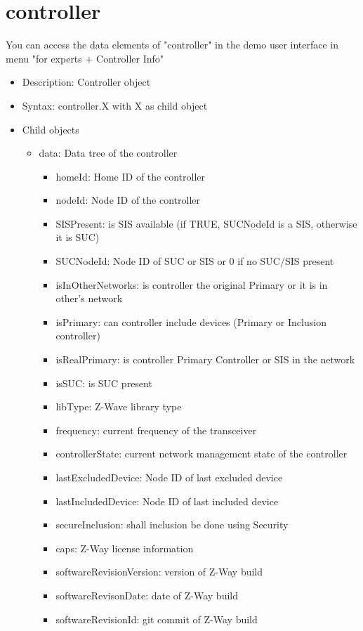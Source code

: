 \section{controller}

You can access the data elements of "controller" in the demo user interface in menu 
"for experts + Controller Info"

\begin {itemize}
\item Description: Controller object
\item Syntax: controller.X with  X as child object
\item Child objects
\begin {itemize}
\item data: Data tree of the controller
\begin {itemize}
\item  homeId: Home ID of the controller
\item  nodeId: Node ID of the controller
\item  SISPresent: is SIS available (if TRUE, SUCNodeId is a SIS, otherwise it is SUC)
\item  SUCNodeId: Node ID of SUC or SIS or 0 if no SUC/SIS present
\item  isInOtherNetworks: is controller the original Primary or it is in other's network
\item  isPrimary: can controller include devices (Primary or Inclusion controller)
\item  isRealPrimary: is controller Primary Controller or SIS in the network
\item  isSUC: is SUC present
\item  libType: Z-Wave library type
\item  frequency: current frequency of the transceiver

\item  controllerState: current network management state of the controller
\item  lastExcludedDevice: Node ID of last excluded device
\item  lastIncludedDevice: Node ID of last included device
\item  secureInclusion: shall inclusion be done using Security

\item  caps: Z-Way license information
\item  softwareRevisionVersion: version of Z-Way build
\item  softwareRevisonDate: date of Z-Way build
\item  softwareRevisionId: git commit of Z-Way build


\end{itemize}
\end{itemize}
\end{itemize}

